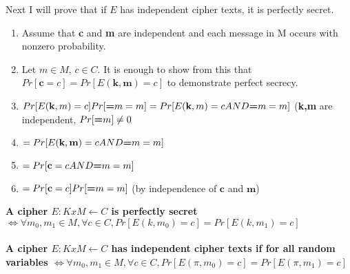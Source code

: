 \documentclass[]{article}
\begin{document}
Next I will prove that if $E$ has independent cipher texts, it is perfectly secret. 
\begin{enumerate}
	\item Assume that \textbf{c} and \textbf{m} are independent and each message in M occurs with nonzero probability.
	\item Let $m \in M$, $c \in C$. It is enough to show from this that $Pr[\textbf{c} = c ]=Pr[E(\textbf{k},\textbf{m}) =c]$ to demonstrate perfect secrecy.
	\item $Pr[E(\textbf{k},m) =c]Pr[\textbf={m} = m] = Pr[E(\textbf{k},m) =c AND \textbf={m} = m]$ (\textbf{k,m} are independent, $Pr[\textbf=m]\neq 0$
	\item $ = Pr[E(\textbf{k},\textbf{m}) =c AND \textbf={m} = m]$
	\item $ =Pr[\textbf{c} = c  AND \textbf={m} = m]$
	\item $ =Pr[\textbf{c} = c]Pr[\textbf={m} = m]$ (by independence of $\textbf{c}$ and $\textbf{m}$)
\end{enumerate}

\textbf{A cipher $E: K x M \leftarrow C$ is perfectly secret $\Leftrightarrow \forall m_0, m_1 \in M, \forall c \in C, Pr[E(k, m_0) = c] = Pr[E(k, m_1) = c]$}
\\\\
\textbf{A cipher $E: K x M \leftarrow C$ has independent cipher texts if for all random variables $\Leftrightarrow \forall m_0, m_1 \in M, \forall c \in C, Pr[E(\pi, m_0) = c] = Pr[E(\pi, m_1) = c]$}
\\\\

\section{}
\end{document}
